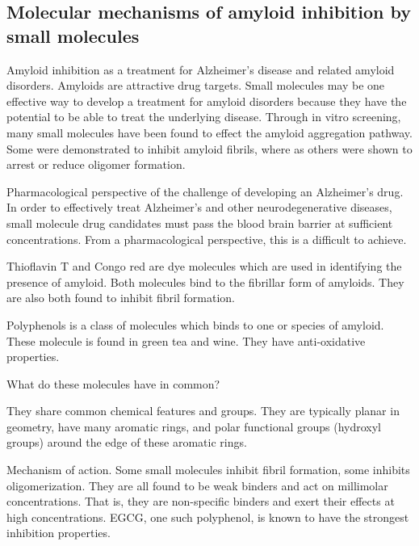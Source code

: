 \subsection{Molecular mechanisms of amyloid inhibition by small molecules}
\begin{outline}[enumerate]
    \1 Amyloid inhibition as a treatment for Alzheimer's disease and related amyloid disorders. Amyloids are attractive drug targets. Small molecules may be one effective way to develop a treatment for amyloid disorders because they have the potential to be able to treat the underlying disease. Through in vitro screening, many small molecules have been found to effect the amyloid aggregation pathway.  Some were demonstrated to inhibit amyloid fibrils, where as others were shown to arrest or reduce oligomer formation.   
      
      \2 Pharmacological perspective of the challenge of developing an Alzheimer's drug. In order to effectively treat Alzheimer's and other neurodegenerative diseases, small molecule drug candidates must pass the blood brain barrier at sufficient concentrations.  From a pharmacological perspective, this is a difficult to achieve.

      \2 Thioflavin T and Congo red are dye molecules which are used in identifying the presence of amyloid.  Both molecules bind to the fibrillar form of amyloids. They are also both found to inhibit fibril formation.
      
      \2 Polyphenols is a class of molecules which binds to one or species of amyloid. These molecule is found in green tea and wine.  They have anti-oxidative properties.
      
    \1 What do these molecules have in common?
	
		\2 They share common chemical features and groups.  They are typically planar in geometry, have many aromatic rings, and polar functional groups (hydroxyl groups) around the edge of these aromatic rings.
    
    	\2 Mechanism of action. Some small molecules inhibit fibril formation, some inhibits oligomerization. They are all found to be weak binders and act on millimolar concentrations. That is, they are non-specific binders and exert their effects at high concentrations. EGCG, one such polyphenol, is known to have the strongest inhibition properties.
	

\end{outline}

